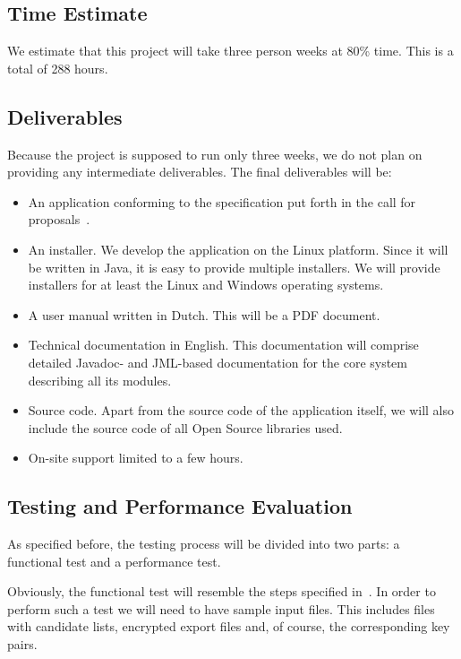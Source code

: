 \documentclass{article}
\begin{document}
\subsection{Time Estimate}

We estimate that this project will take three person weeks at 80\% time.
This is a total of 288 hours.

\subsection{Deliverables}

Because the project is supposed to run only three weeks, we do not
plan on providing any intermediate deliverables.  The final
deliverables will be:
\begin{itemize}
\item An application conforming to the specification put forth
  in the call for proposals~\cite{PVEBZK}.
\item An installer. We develop the application on the Linux platform.
  Since it will be written in Java, it is easy to provide multiple
  installers.  We will provide installers for at least the Linux and
  Windows operating systems.
\item A user manual written in Dutch. This will be a PDF document.
\item Technical documentation in English. This documentation will
  comprise detailed Javadoc- and JML-based documentation for the core
  system describing all its modules.
\item Source code. Apart from the source code of the application
  itself, we will also include the source code of all Open Source
  libraries used.
\item On-site support limited to a few hours.
\end{itemize}

\subsection{Testing and Performance Evaluation}

As specified before, the testing process will be divided into two
parts: a functional test and a performance test.  

Obviously, the functional test will resemble the steps specified
in~\cite{PVEBZK}.  In order to perform such a test we will need to
have sample input files.  This includes files with candidate lists,
encrypted export files and, of course, the corresponding key pairs.
\end{document}
